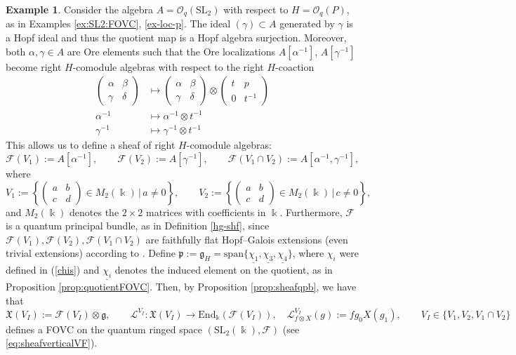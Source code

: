 \documentclass{article}
\theoremstyle{definition}
\newtheorem{example}[thm]{Example}
\newcommand{\cO}{{\mathcal{O}}}
\newcommand{\rSL}{{\mathrm{SL}}}
\newcommand{\Chi}{{\mathfrak{X}}}
\newcommand{\fg}{{\mathfrak{g}}}
\newcommand{\cF}{{\mathcal{F}}}
\begin{document}
\begin{example}\label{ex:vert-sheaf}
Consider the algebra $A=\cO_q(\rSL_2)$ with respect to $H=\cO_q(P)$, as in Examples \ref{ex:SL2:FOVC}, \ref{ex-loc-p}. 
The ideal $(\gamma)\subset A$ generated by $\gamma$ is a Hopf ideal and thus the quotient map 
is a Hopf algebra surjection. 
Moreover, both $\alpha, \gamma \in A$ are Ore elements such that the Ore localizations $A[\alpha^{-1}]$, $A[\gamma^{-1}]$
become right $H$-comodule algebras with respect to the right $H$-coaction
\begin{align*}
	\begin{pmatrix}
		\alpha & \beta\\
		\gamma & \delta
	\end{pmatrix}&\mapsto\begin{pmatrix}
		\alpha & \beta\\
		\gamma & \delta
	\end{pmatrix}\otimes\begin{pmatrix}
		t & p\\
		0 & t^{-1}
	\end{pmatrix}
	\\
	\alpha^{-1}&\mapsto\alpha^{-1}\otimes t^{-1}\\
	\gamma^{-1}&\mapsto\gamma^{-1}\otimes t^{-1}
\end{align*}
This allows us to define a sheaf of right $H$-comodule algebras:
$$
\cF(V_1):=A[\alpha^{-1}], \qquad \cF(V_2):=A[\gamma^{-1}], \qquad \cF(V_1 \cap V_2):=A[\alpha^{-1}, \gamma^{-1}],
$$
where 
$$
V_1:=\left\{ \begin{pmatrix}
	a & b\\
	c & d
\end{pmatrix} \in M_2(\Bbbk) \, \bigg| \, a \neq 0\right\}, \qquad V_2:=\left\{ \begin{pmatrix}
	a & b\\
	c & d
\end{pmatrix}\in M_2(\Bbbk)\,\bigg| \, c \neq 0\right\}, 
$$
and $M_2(\Bbbk)$ denotes the $2 \times 2$ matrices with coefficients in $\Bbbk$.
Furthermore, $\mathcal{F}$ is a quantum principal bundle, as in Definition \ref{hg-shf}, since $\mathcal{F}(V_1),\mathcal{F}(V_2),\mathcal{F}(V_1\cap V_2)$ are faithfully flat Hopf--Galois extensions (even trivial extensions) according to \cite[Section 4.5.1]{aflw}. 
Define
$\mathfrak{p}:=\mathfrak{g}_H=\mathrm{span}\{\underline{\chi_1},\underline{\chi_3},\underline{\chi_4}\}$,
where $\chi_i$ were defined in (\ref{chis}) and $\underline{\chi_i}$ denotes the induced element on the quotient, as in Proposition \ref{prop:quotientFOVC}. 
Then, by Proposition \ref{prop:sheafqpb},  we have that
$$ 
\Chi(V_I):=\cF(V_I) \otimes \fg, \qquad \mathscr{L}^{V_I}:\Chi(V_I) \to  \mathrm{End}_\Bbbk(\cF(V_I)),
\quad \mathscr{L}^{V_I}_{f \otimes X}(g):=fg_0X(g_1), \qquad V_I \in \{V_1, V_2, V_1 \cap V_2\}
$$
defines a FOVC on the quantum ringed space $(\rSL_2(\Bbbk), \cF)$ (see \ref{eq:sheafverticalVF}).
\end{example}
\end{document}
